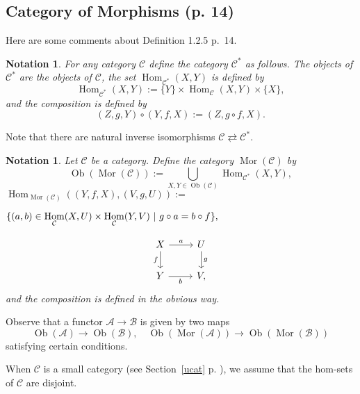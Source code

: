 \documentclass[12pt]{article}
\newtheorem{nota}[thm]{Notation}
\theoremstyle{remark}
\theoremstyle{definition}
\newcommand{\nn}{\noindent}
\newcommand{\A}{\mathcal A}
\newcommand{\B}{\mathcal B}
\newcommand{\C}{\mathcal C}
\DeclareMathOperator{\Hom}{Hom}%
\DeclareMathOperator{\Mor}{Mor}
\DeclareMathOperator{\Ob}{Ob}
\begin{document}
\subsection{Category of Morphisms (p. 14)}\label{d125}
%
Here are some comments about Definition 1.2.5 p.~14.
%
\begin{nota}\label{c*}
%
For any category $\C$ define the category $\C^*$ as follows. The objects of $\C^*$ are the objects of $\C$, the set $\Hom_{\C^*}(X,Y)$ is defined by 
$$
\Hom_{\C^*}(X,Y):=\{Y\}\times\Hom_{\C}(X,Y)\times\{X\},
$$
and the composition is defined by 
$$
(Z,g,Y)\circ(Y,f,X):=(Z,g\circ f,X).
$$ 
%
\end{nota}
%
Note that there are natural inverse isomorphisms $\C\rightleftarrows\C^*$. 
%
\begin{nota}\label{mor}
%
Let $\C$ be a category. Define the category $\Mor(\C)$ by 
$$
\Ob(\Mor(\C)):=\bigcup_{X,Y\in\Ob(\C)}\Hom_{\C^*}(X,Y),
$$
$\displaystyle \Hom_{\Mor(\C)}((Y,f,X),(V,g,U)):=$\bigskip 

$\hfill\displaystyle\{(a,b)\in\Hom_\C(X,U)\times\Hom_\C(Y,V)\ | \ g\circ a=b\circ f\},$\bigskip

\nn{\em i.e.} 
$$
\begin{tikzcd}
X\ar{d}[swap]{f}\ar{r}{a}&U\ar{d}{g}\\ 
Y\ar{r}[swap]{b}&V,
\end{tikzcd}
$$ 
and the composition is defined in the obvious way.
%
\end{nota}
%
Observe that a functor $\A\to\B$ is given by two maps 
$$
\Ob(\A)\to\Ob(\B),\quad\Ob(\Mor(\A))\to\Ob(\Mor(\B))
$$ 
satisfying certain conditions.

When $\C$ is a small category (see Section~\ref{ucat} p. \pageref{ucat}), we assume that the hom-sets of $\C$ are disjoint.
%
%
\end{document}
